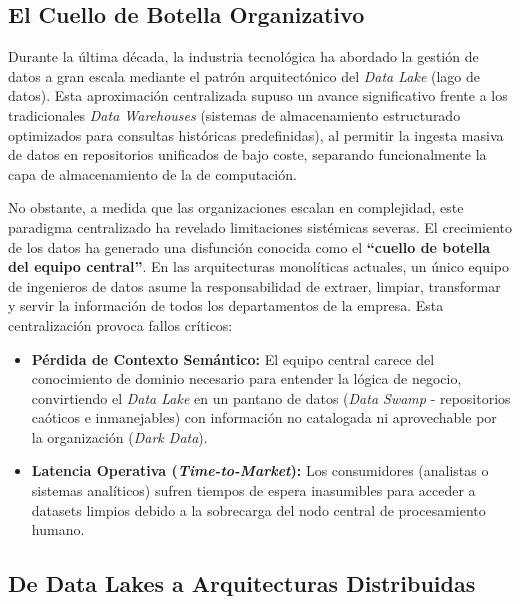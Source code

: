 \documentclass[12pt, a4paper]{article}
\begin{document}
\subsection{El Cuello de Botella Organizativo}

Durante la última década, la industria tecnológica ha abordado la gestión de datos a gran escala mediante el patrón arquitectónico del \textit{Data Lake} (lago de datos). Esta aproximación centralizada supuso un avance significativo frente a los tradicionales \textit{Data Warehouses} (sistemas de almacenamiento estructurado optimizados para consultas históricas predefinidas), al permitir la ingesta masiva de datos en repositorios unificados de bajo coste, separando funcionalmente la capa de almacenamiento de la de computación.

No obstante, a medida que las organizaciones escalan en complejidad, este paradigma centralizado ha revelado limitaciones sistémicas severas. El crecimiento de los datos ha generado una disfunción conocida como el \textbf{``cuello de botella del equipo central''}. En las arquitecturas monolíticas actuales, un único equipo de ingenieros de datos asume la responsabilidad de extraer, limpiar, transformar y servir la información de todos los departamentos de la empresa. Esta centralización provoca fallos críticos:

\begin{itemize}
    \item \textbf{Pérdida de Contexto Semántico:} El equipo central carece del conocimiento de dominio necesario para entender la lógica de negocio, convirtiendo el \textit{Data Lake} en un pantano de datos (\textit{Data Swamp} - repositorios caóticos e inmanejables) con información no catalogada ni aprovechable por la organización (\textit{Dark Data}).
    \item \textbf{Latencia Operativa (\textit{Time-to-Market}):} Los consumidores (analistas o sistemas analíticos) sufren tiempos de espera inasumibles para acceder a datasets limpios debido a la sobrecarga del nodo central de procesamiento humano.
\end{itemize}

\subsection{De Data Lakes a Arquitecturas Distribuidas}
\end{document}
